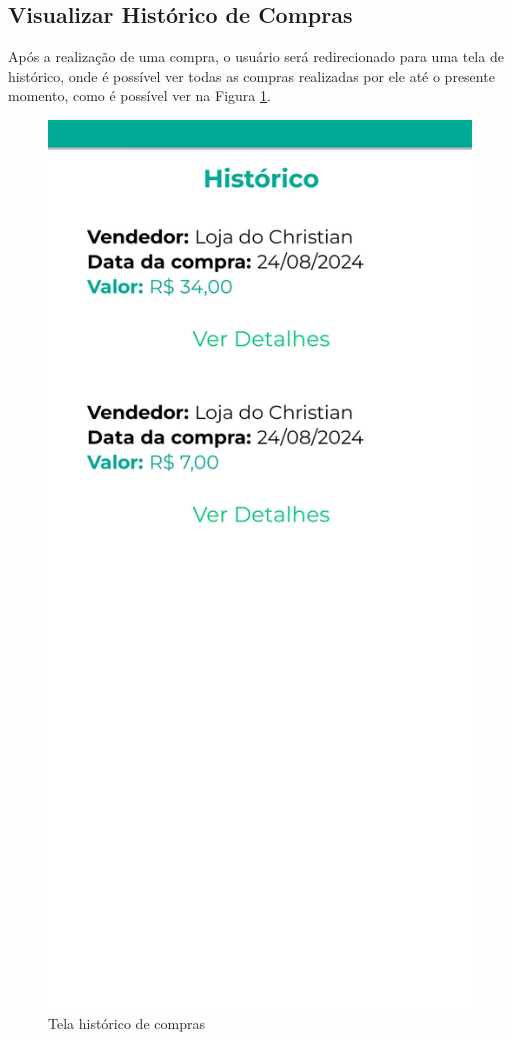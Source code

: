\subsection{Visualizar Histórico de Compras}
Após a realização de uma compra, o usuário será redirecionado para uma tela de histórico, onde é possível ver todas as compras realizadas por ele até o presente momento, como é possível ver na Figura \ref{tela-historico-app}.

\begin{figure}[h]
	\centering
	\includegraphics[keepaspectratio=true,scale=0.16]{figuras/historico_compras.jpg}
	\caption{Tela histórico de compras}
        \label{tela-historico-app}
\end{figure}

